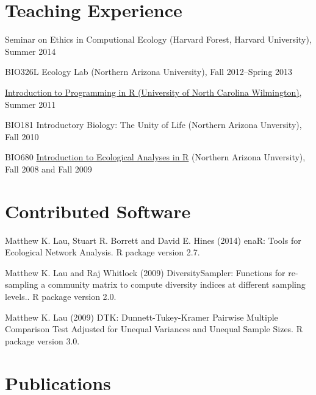 \documentclass[letterpaper]{article}
\renewenvironment{itemize}{
  \begin{list}{}{
    \setlength{\leftmargin}{1em}
  }
}{
  \end{list}
}
\begin{document}
\section{Teaching Experience}
\begin{itemize}
\item Seminar on Ethics in Computional Ecology (Harvard Forest,
  Harvard University), Summer 2014
\item BIO326L Ecology Lab (Northern Arizona University), Fall 2012--Spring 2013
\item \href{http://people.uncw.edu/borretts/courses/RworkshopUNCW.pdf}{Introduction to Programming in R (University of North Carolina
  Wilmington)}, Summer 2011
\item BIO181 Introductory Biology: The Unity of Life (Northern
  Arizona Unversity), Fall 2010
\item BIO680
  \href{http://www.mpcer.nau.edu/igert/eco_analysis_r.html}{Introduction
    to Ecological Analyses in R} (Northern Arizona Unversity), Fall
  2008 and Fall 2009
\end{itemize}

\section{Contributed Software}
\begin{description}

\item{Matthew K. Lau, Stuart R. Borrett and David E. Hines (2014)
  enaR: Tools for Ecological Network Analysis. R package version 2.7.}

\item{Matthew K. Lau and Raj Whitlock (2009) DiversitySampler: Functions for re-sampling a community matrix to compute diversity indices at different sampling levels.. R package version 2.0.}

\item{Matthew K. Lau (2009) DTK: Dunnett-Tukey-Kramer Pairwise Multiple
  Comparison Test Adjusted for Unequal Variances and Unequal Sample Sizes. R
  package version 3.0.}

\end{description}


\section{Publications}
\end{document}
